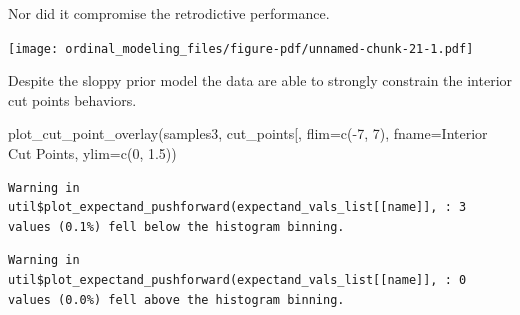 \documentclass[
  letterpaper,
  DIV=11,
  numbers=noendperiod]{scrartcl}
\newenvironment{Shaded}{\begin{snugshade}}{\end{snugshade}}
\newcommand{\AttributeTok}[1]{\textcolor[rgb]{0.40,0.45,0.13}{#1}}
\newcommand{\DecValTok}[1]{\textcolor[rgb]{0.68,0.00,0.00}{#1}}
\newcommand{\FloatTok}[1]{\textcolor[rgb]{0.68,0.00,0.00}{#1}}
\newcommand{\FunctionTok}[1]{\textcolor[rgb]{0.28,0.35,0.67}{#1}}
\newcommand{\NormalTok}[1]{\textcolor[rgb]{0.00,0.23,0.31}{#1}}
\newcommand{\SpecialCharTok}[1]{\textcolor[rgb]{0.37,0.37,0.37}{#1}}
\newcommand{\StringTok}[1]{\textcolor[rgb]{0.13,0.47,0.30}{#1}}
\begin{document}
Nor did it compromise the retrodictive performance.

\begin{Shaded}
\end{Shaded}

\texttt{[image: ordinal\_modeling\_files/figure-pdf/unnamed-chunk-21-1.pdf]}

Despite the sloppy prior model the data are able to strongly constrain
the interior cut points behaviors.

\begin{Shaded}
\begin{Highlighting}[]
\FunctionTok{plot\_cut\_point\_overlay}\NormalTok{(samples3, }\StringTok{\textquotesingle{}cut\_points[\textquotesingle{}}\NormalTok{,}
                       \AttributeTok{flim=}\FunctionTok{c}\NormalTok{(}\SpecialCharTok{{-}}\DecValTok{7}\NormalTok{, }\DecValTok{7}\NormalTok{), }\AttributeTok{fname=}\StringTok{\textquotesingle{}Interior Cut Points\textquotesingle{}}\NormalTok{,}
                       \AttributeTok{ylim=}\FunctionTok{c}\NormalTok{(}\DecValTok{0}\NormalTok{, }\FloatTok{1.5}\NormalTok{))}
\end{Highlighting}
\end{Shaded}

\begin{verbatim}
Warning in util$plot_expectand_pushforward(expectand_vals_list[[name]], : 3
values (0.1%) fell below the histogram binning.
\end{verbatim}

\begin{verbatim}
Warning in util$plot_expectand_pushforward(expectand_vals_list[[name]], : 0
values (0.0%) fell above the histogram binning.
\end{verbatim}
\end{document}
